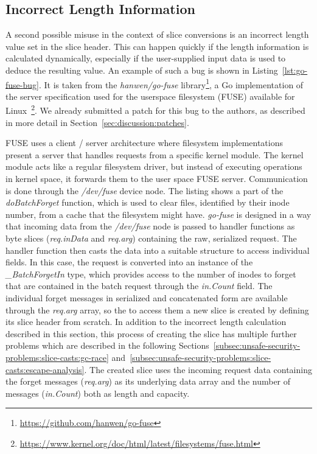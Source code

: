 \subsection{Incorrect Length Information}\label{subsec:unsafe-security-problems:slice-casts:incorrect-length}

A second possible misuse in the context of slice conversions is an incorrect length value set in the slice header.
This can happen quickly if the length information is calculated dynamically, especially if the user-supplied input data
is used to deduce the resulting value.
An example of such a bug is shown in Listing~\ref{lst:go-fuse-bug}.
It is taken from the \textit{hanwen/go-fuse} library\footnote{\url{https://github.com/hanwen/go-fuse}}, a Go
implementation of the server specification used for the userspace filesystem (\acrshort{FUSE}) available for
Linux~\footnote{\url{https://www.kernel.org/doc/html/latest/filesystems/fuse.html}}.
We already submitted a patch for this bug to the authors, as described in more detail in
Section~\ref{sec:discussion:patches}.



\acrshort{FUSE} uses a client / server architecture where filesystem implementations present a server that handles
requests from a specific kernel module.
The kernel module acts like a regular filesystem driver, but instead of executing operations in kernel space, it
forwards them to the user space \acrshort{FUSE} server.
Communication is done through the \textit{/dev/fuse} device node.
The listing shows a part of the \textit{doBatchForget} function, which is used to clear files, identified by their inode
number, from a cache that the filesystem might have.
\textit{go-fuse} is designed in a way that incoming data from the \textit{/dev/fuse} node is passed to handler functions
as byte slices (\textit{req.inData} and \textit{req.arg}) containing the raw, serialized request.
The handler function then casts the data into a suitable structure to access individual fields.
In this case, the request is converted into an instance of the \textit{\_BatchForgetIn} type, which provides access to
the number of inodes to forget that are contained in the batch request through the \textit{in.Count} field.
The individual forget messages in serialized and concatenated form are available through the \textit{req.arg} array, so
the to access them a new slice is created by defining its slice header from scratch.
In addition to the incorrect length calculation described in this section, this process of creating the slice has
multiple further problems which are described in the following Sections~\ref{subsec:unsafe-security-problems:slice-casts:gc-race}
and~\ref{subsec:unsafe-security-problems:slice-casts:escape-analysis}.
The created slice uses the incoming request data containing the forget messages (\textit{req.arg}) as its underlying
data array and the number of messages (\textit{in.Count}) both as length and capacity.

